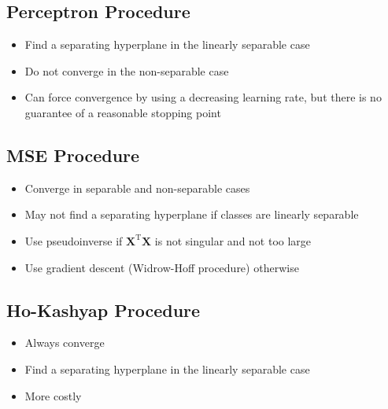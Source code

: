 \documentclass[11pt,a4paper]{article}
\theoremstyle{definition}
\theoremstyle{plain}
\theoremstyle{remark}
\begin{document}
\begin{tcolorbox}[colback=purple!5!white,colframe=purple!75!black,title=\textbf{Comparison of Methods}]

\subsection*{Perceptron Procedure}
\begin{itemize}
    \item Find a separating hyperplane in the linearly separable case
    \item Do not converge in the non-separable case
    \item Can force convergence by using a decreasing learning rate, but there is no guarantee of a reasonable stopping point
\end{itemize}

\subsection*{MSE Procedure}
\begin{itemize}
    \item Converge in separable and non-separable cases
    \item May not find a separating hyperplane if classes are linearly separable
    \item Use pseudoinverse if $\mathbf{X}^{\mathrm{T}}\mathbf{X}$ is not singular and not too large
    \item Use gradient descent (Widrow-Hoff procedure) otherwise
\end{itemize}

\subsection*{Ho-Kashyap Procedure}
\begin{itemize}
    \item Always converge
    \item Find a separating hyperplane in the linearly separable case
    \item More costly
\end{itemize}
\end{tcolorbox}
\end{document}
